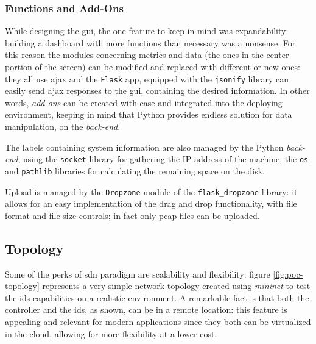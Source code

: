 \subsubsection{Functions and Add-Ons}
\label{subsubsec:functions}

While designing the \gls{gui}, the one feature to keep in mind was expandability: building a dashboard with more functions than necessary was a nonsense. For this reason the modules concerning metrics and data (the ones in the center portion of the screen) can be modified and replaced with different or new ones: they all use \gls{ajax} and the \texttt{Flask} app, equipped with the \texttt{jsonify} library can easily send \gls{ajax} responses to the \gls{gui}, containing the desired information. In other words, \textit{add-ons} can be created with ease and integrated into the deploying environment, keeping in mind that Python provides endless solution for data manipulation, on the \textit{back-end}.
\par The labels containing system information are also managed by the Python \textit{back-end}, using the \texttt{socket} library for gathering the IP address of the machine, the \texttt{os} and \texttt{pathlib} libraries for calculating the remaining space on the disk.
\par Upload is managed by the \texttt{Dropzone} module of the \texttt{flask\_dropzone} library: it allows for an easy implementation of the drag and drop functionality, with file format and file size controls; in fact only \gls{pcap} files can be uploaded.


\subsection{Topology}
\label{subsec:topology}

Some of the perks of \gls{sdn} paradigm are scalability and flexibility: figure \ref{fig:poc-topology} represents a very simple network topology created using \textit{mininet} to test the \gls{ids} capabilities on a realistic environment. A remarkable fact is that both the controller and the \gls{ids}, as shown, can be in a remote location: this feature is appealing and relevant for modern applications since they both can be virtualized in the cloud, allowing for more flexibility at a lower cost.


